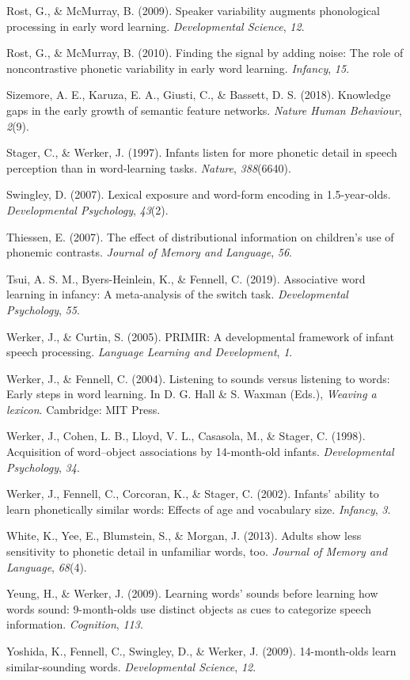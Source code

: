 \documentclass[english,,man,floatsintext]{apa6}
\theoremstyle{definition}
\theoremstyle{definition}
\theoremstyle{definition}
\theoremstyle{remark}
\begin{document}
\hypertarget{ref-rost2009}{}
Rost, G., \& McMurray, B. (2009). Speaker variability augments
phonological processing in early word learning. \emph{Developmental
Science}, \emph{12}.

\hypertarget{ref-rost2010}{}
Rost, G., \& McMurray, B. (2010). Finding the signal by adding noise:
The role of noncontrastive phonetic variability in early word learning.
\emph{Infancy}, \emph{15}.

\hypertarget{ref-sizemore2018}{}
Sizemore, A. E., Karuza, E. A., Giusti, C., \& Bassett, D. S. (2018).
Knowledge gaps in the early growth of semantic feature networks.
\emph{Nature Human Behaviour}, \emph{2}(9).

\hypertarget{ref-stager1997}{}
Stager, C., \& Werker, J. (1997). Infants listen for more phonetic
detail in speech perception than in word-learning tasks. \emph{Nature},
\emph{388}(6640).

\hypertarget{ref-swingley2007}{}
Swingley, D. (2007). Lexical exposure and word-form encoding in
1.5-year-olds. \emph{Developmental Psychology}, \emph{43}(2).

\hypertarget{ref-thiessen2007}{}
Thiessen, E. (2007). The effect of distributional information on
children's use of phonemic contrasts. \emph{Journal of Memory and
Language}, \emph{56}.

\hypertarget{ref-tsui2019}{}
Tsui, A. S. M., Byers-Heinlein, K., \& Fennell, C. (2019). Associative
word learning in infancy: A meta-analysis of the switch task.
\emph{Developmental Psychology}, \emph{55}.

\hypertarget{ref-werker2005}{}
Werker, J., \& Curtin, S. (2005). PRIMIR: A developmental framework of
infant speech processing. \emph{Language Learning and Development},
\emph{1}.

\hypertarget{ref-werker2004}{}
Werker, J., \& Fennell, C. (2004). Listening to sounds versus listening
to words: Early steps in word learning. In D. G. Hall \& S. Waxman
(Eds.), \emph{Weaving a lexicon}. Cambridge: MIT Press.

\hypertarget{ref-werker1998}{}
Werker, J., Cohen, L. B., Lloyd, V. L., Casasola, M., \& Stager, C.
(1998). Acquisition of word--object associations by 14-month-old
infants. \emph{Developmental Psychology}, \emph{34}.

\hypertarget{ref-werker2002}{}
Werker, J., Fennell, C., Corcoran, K., \& Stager, C. (2002). Infants'
ability to learn phonetically similar words: Effects of age and
vocabulary size. \emph{Infancy}, \emph{3}.

\hypertarget{ref-white2013}{}
White, K., Yee, E., Blumstein, S., \& Morgan, J. (2013). Adults show
less sensitivity to phonetic detail in unfamiliar words, too.
\emph{Journal of Memory and Language}, \emph{68}(4).

\hypertarget{ref-yeung09}{}
Yeung, H., \& Werker, J. (2009). Learning words' sounds before learning
how words sound: 9-month-olds use distinct objects as cues to categorize
speech information. \emph{Cognition}, \emph{113}.

\hypertarget{ref-yoshida2009}{}
Yoshida, K., Fennell, C., Swingley, D., \& Werker, J. (2009).
14-month-olds learn similar-sounding words. \emph{Developmental
Science}, \emph{12}.
\end{document}

